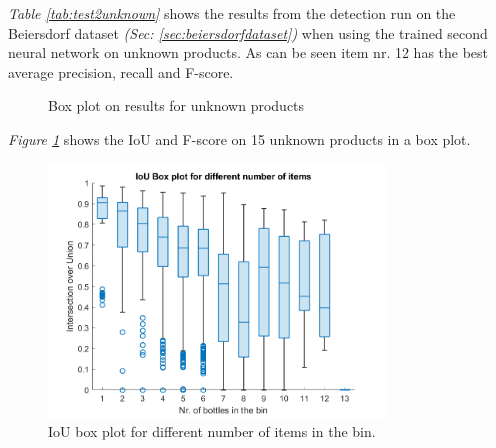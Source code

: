 \textit{Table \ref{tab:test2unknown}} shows the results from the detection run on the Beiersdorf dataset \textit{(Sec: \ref{sec:beiersdorfdataset})} when using the trained second neural network on unknown products. As can be seen item nr. 12 has the best average precision, recall and F-score.


\clearpage

\begin{figure}[h]
    \centering
    \hfill
    
    \caption{Box plot on results for unknown products}
    \label{fig:v2unknowniou}
\end{figure}

\textit{Figure \ref{fig:v2unknowniou}} shows the IoU and F-score on 15 unknown products in a box plot.
\begin{figure}[h]
    \centering
    \includegraphics[width=0.8\textwidth]{graphics/results/v2boxplotBottles.png}
    \caption{IoU box plot for different number of items in the bin.}
    \label{fig:v2bottles}
\end{figure}

